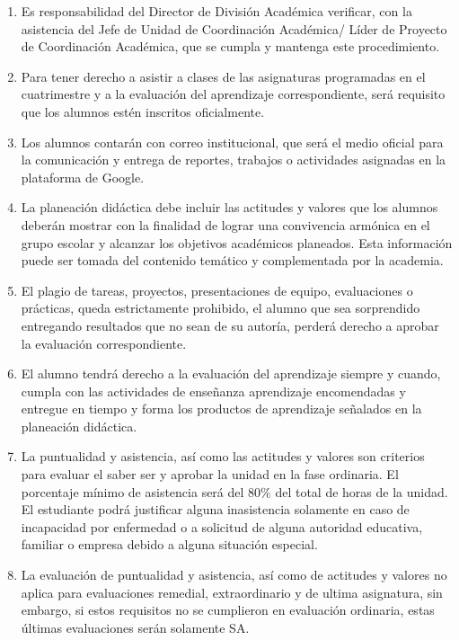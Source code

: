 \documentclass[10pt,letterpaper]{article}
\begin{document}
	\begin{enumerate}
		\item Es responsabilidad del Director de División Académica verificar, con la asistencia del Jefe de Unidad de Coordinación Académica/ Líder de Proyecto de Coordinación Académica, que se cumpla y mantenga este procedimiento.
		
		\item Para tener derecho a asistir a clases de las asignaturas programadas en el cuatrimestre y a la evaluación del aprendizaje correspondiente, será requisito que los alumnos estén inscritos oficialmente.
		
		\item Los alumnos contarán con correo institucional, que será el medio oficial para la comunicación y entrega de reportes, trabajos o actividades asignadas en la plataforma de Google.
		
		\item La planeación didáctica debe incluir las actitudes y valores que los alumnos deberán mostrar con la finalidad de lograr una convivencia armónica en el grupo escolar y alcanzar los objetivos académicos planeados. Esta información puede ser tomada del contenido temático y complementada por la academia.
		
		\item El plagio de tareas, proyectos, presentaciones de equipo, evaluaciones o prácticas, queda estrictamente prohibido, el alumno que sea sorprendido entregando resultados que no sean de su autoría, perderá derecho a aprobar la evaluación correspondiente.
		
		\item El alumno tendrá derecho a la evaluación del aprendizaje siempre y cuando, cumpla con las actividades de enseñanza aprendizaje encomendadas y entregue en tiempo y forma los productos de aprendizaje señalados en la planeación didáctica.
		
		\item La puntualidad y asistencia, así como las actitudes y valores son criterios para evaluar el saber ser y aprobar la unidad en la fase ordinaria. El porcentaje mínimo de asistencia será del 80\% del total de horas de la unidad. El estudiante podrá justificar alguna inasistencia solamente en caso de incapacidad por enfermedad o a solicitud de alguna autoridad educativa, familiar o empresa debido a alguna situación especial.
		
		\item La evaluación de puntualidad y asistencia, así como de actitudes y valores no aplica para evaluaciones remedial, extraordinario y de ultima asignatura, sin embargo, si estos requisitos no se cumplieron en evaluación ordinaria, estas últimas evaluaciones serán solamente SA.
		

\end{enumerate}
\end{document}
